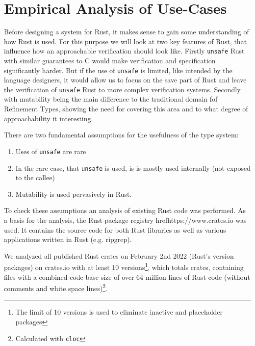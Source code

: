 \documentclass{book}
\newcommand{\code}[1]{\texttt{#1}}
\theoremstyle{definition}
\begin{document}
\chapter{Empirical Analysis of Use-Cases}

Before designing a system for Rust, it makes sense to gain some understanding of how Rust is used. For this purpose we will look at two key features of Rust, that influence how an approachable verification should look like.
Firstly \code{unsafe} Rust with similar guarantees to C would make verification and specification significantly harder. But if the use of \code{unsafe} is limited, like intended by the language designers, it would allow us to focus on the save part of Rust and leave the verification of \code{unsafe} Rust to more complex verification systems.
Secondly with mutability being the main difference to the traditional domain fof Refinement Types, showing the need for covering this area and to what degree of approachability it interesting.

There are two fundamental assumptions for the usefulness of the type system: 
\begin{enumerate}
  \item \label{enum:hypothesis-unsafe-rare} Uses of \code{unsafe} are rare
  \item \label{enum:hypothesis-unsafe-lib} In the rare case, that \code{unsafe} is used, is is mostly used internally (not exposed to the callee)
  \item \label{enum:hypothesis-mut} Mutability is used pervasively in Rust.
\end{enumerate}

To check these assumptions an analysis of existing Rust code was performed. As a basis for the analysis, the Rust package registry href{https://www.crates.io} was used. It contains the source code for both Rust libraries as well as various applications written in Rust (e.g. ripgrep). 

We analyzed all published Rust crates on February 2nd 2022 (Rust's version packages) on crates.io with at least 10 versions\footnote{The limit of 10 versions is used to eliminate inactive and placeholder packages}, which totals  crates, containing  files with a combined code-base size of over 64 million lines of Rust code (without comments and white space lines)\footnote{Calculated with \texttt{cloc}}. 
\end{document}
